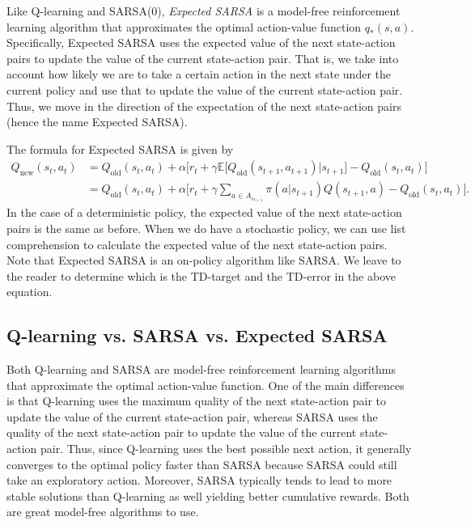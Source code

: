Like Q-learning and SARSA(0), \emph{Expected SARSA} is a model-free reinforcement learning algorithm that approximates the optimal action-value function $q_*(s,a)$.
Specifically, Expected SARSA uses the expected value of the next state-action pairs to update the value of the current state-action pair.
That is, we take into account how likely we are to take a certain action in the next state under the current policy and use that to update the value of the current state-action pair.
Thus, we move in the direction of the expectation of the next state-action pairs (hence the name Expected SARSA).

The formula for Expected SARSA is given by
\begin{align*}
    Q_{\text{new}}(s_t,a_t) &= Q_{\text{old}}(s_t,a_t) + \alpha \Biggr[r_t + \gamma \mathbb{E}\bigr[Q_{\text{old}}(s_{t+1},a_{t+1}) \bigl\lvert s_{t+1} \bigl] - Q_{\text{old}}(s_t,a_t)\Biggl] \\
                            & = Q_{\text{old}}(s_t,a_t) + \alpha \Biggr[r_t + \gamma \sum_{a\in A_{s_{t+1}}} \pi(a|s_{t+1}) Q(s_{t+1},a)   - Q_{\text{old}}(s_t,a_t)\Biggl].
\end{align*}
In the case of a deterministic policy, the expected value of the next state-action pairs is the same as before.
When we do have a stochastic policy, we can use list comprehension to calculate the expected value of the next state-action pairs.
Note that Expected SARSA is an on-policy algorithm like SARSA.
We leave to the reader to determine which is the TD-target and the TD-error in the above equation.

\subsection*{Q-learning vs. SARSA vs. Expected SARSA}
Both Q-learning and SARSA are model-free reinforcement learning algorithms that approximate the optimal action-value function.
One of the main differences is that Q-learning uses the maximum quality of the next state-action pair to update the value of the current state-action pair, whereas SARSA uses the quality of the next state-action pair to update the value of the current state-action pair.
Thus, since Q-learning uses the best possible next action, it generally converges to the optimal policy faster than SARSA because SARSA could still take an exploratory action.
Moreover, SARSA typically tends to lead to more stable solutions than Q-learning as well yielding better cumulative rewards.
Both are great model-free algorithms to use.

